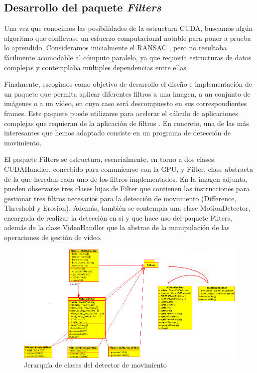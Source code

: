 \documentclass[twoside]{article}
\begin{document}
\subsection{Desarrollo del paquete \emph{Filters}}

Una vez que conocimos las posibilidades de la estructura CUDA, buscamos algún algoritmo que conllevase un esfuerzo computacional notable para poner a prueba lo aprendido. Consideramos inicialmente el RANSAC \cite{Jiayin:2010:CMD:1933304.1933936}, pero no resultaba fácilmente acomodable al cómputo paralelo, ya que requería estructuras de datos complejas y contemplaba múltiples dependencias entre ellas.

\vspace{5 mm}

Finalmente, escogimos como objetivo de desarrollo el diseño e implementación de un paquete que permita aplicar diferentes filtros a una imagen, a un conjunto de imágenes o a un vídeo, en cuyo caso será descompuesto en sus correspondientes frames. Este paquete puede utilizarse para acelerar el cálculo de aplicaciones complejas que requieran de la aplicación de filtros \cite{DBLP:conf/csse/YangZP08}. En concreto, una de las más interesantes que hemos adaptado consiste en un programa de detección de movimiento.

\vspace{5 mm}

El paquete Filters se estructura, esencialmente, en torno a dos clases: CUDAHandler, concebido para comunicarse con la GPU, y Filter, clase abstracta de la que heredan cada uno de los filtros implementados. En la imagen adjunta, pueden observarse tres clases hijas de Filter que contienen las instrucciones para gestionar tres filtros necesarios para la detección de movimiento (Difference, Threshold y Erosion). Además, también se contempla una clase MotionDetector, encargada de realizar la detección en sí y que hace uso del paquete Filters, además de la clase VideoHandler que la abstrae de la manipulación de las operaciones de gestión de vídeo.

\begin{figure}
   \begin{center}
      \includegraphics[width=.8\textwidth]{UML.png}
      \caption{\label{fig:UML}Jerarquía de clases del detector de movimiento}
   \end{center}
\end{figure}
\end{document}
